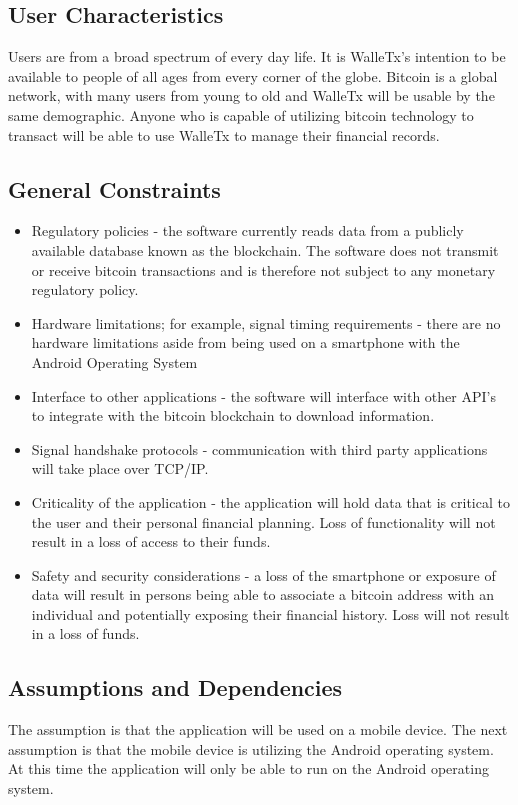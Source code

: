   \subsection{User Characteristics}
  Users are from a broad spectrum of every day life. It is WalleTx's intention to be available to people of all ages from every corner of the globe. Bitcoin is a global network, with many users from young to old and WalleTx will be usable by the same demographic.  Anyone who is capable of utilizing bitcoin technology to transact will be able to use WalleTx to manage their financial records. 
  \subsection{General Constraints}
  \begin{itemize}

    \item Regulatory policies - the software currently reads data from a publicly available database known as the blockchain. The software does not transmit or receive bitcoin transactions and is therefore not subject to any monetary regulatory policy.
    \item Hardware limitations; for example, signal timing requirements - there are no hardware limitations aside from being used on a smartphone with the Android Operating System
    \item Interface to other applications - the software will interface with other API's to integrate with the bitcoin blockchain to download information.
    \item Signal handshake protocols - communication with third party applications will take place over TCP/IP.
    \item Criticality of the application - the application will hold data that is critical to the user and their personal financial planning. Loss of functionality will not result in a loss of access to their funds.
    \item Safety and security considerations - a loss of the smartphone or exposure of data will result in persons being able to associate a bitcoin address with an individual and potentially exposing their financial history. Loss will not result in a loss of funds.

  \end{itemize}

  \subsection{Assumptions and Dependencies}
  The assumption is that the application will be used on a mobile device. The next assumption is that the mobile device is utilizing the Android operating system. At this time the application will only be able to run on the Android operating system.
